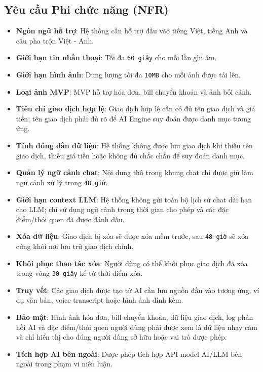 \subsection{Yêu cầu Phi chức năng (NFR)}

\begin{itemize}
\item \textbf{Ngôn ngữ hỗ trợ}: Hệ thống cần hỗ trợ đầu vào tiếng Việt, tiếng Anh và câu pha trộn Việt - Anh.
\item \textbf{Giới hạn tin nhắn thoại}: Tối đa \texttt{60 giây} cho mỗi lần ghi âm.
\item \textbf{Giới hạn hình ảnh}: Dung lượng tối đa \texttt{10MB} cho mỗi ảnh được tải lên.
\item \textbf{Loại ảnh MVP}: MVP hỗ trợ hóa đơn, bill chuyển khoản và ảnh bối cảnh.
\item \textbf{Tiêu chí giao dịch hợp lệ}: Giao dịch hợp lệ cần có đủ tên giao dịch và giá tiền; tên giao dịch phải đủ rõ để AI Engine suy đoán được danh mục tương ứng.
\item \textbf{Tính đúng đắn dữ liệu}: Hệ thống không được lưu giao dịch khi thiếu tên giao dịch, thiếu giá tiền hoặc không đủ chắc chắn để suy đoán danh mục.
\item \textbf{Quản lý ngữ cảnh chat}: Nội dung thô trong khung chat chỉ được giữ làm ngữ cảnh xử lý trong \texttt{48 giờ}.
\item \textbf{Giới hạn context LLM}: Hệ thống không gửi toàn bộ lịch sử chat dài hạn cho LLM; chỉ sử dụng ngữ cảnh trong thời gian cho phép và các đặc điểm/thói quen đã được đánh dấu.
\item \textbf{Xóa dữ liệu}: Giao dịch bị xóa sẽ được xóa mềm trước, sau \texttt{48 giờ} sẽ xóa cứng khỏi nơi lưu trữ giao dịch chính.
\item \textbf{Khôi phục thao tác xóa}: Người dùng có thể khôi phục giao dịch đã xóa trong vòng \texttt{30 giây} kể từ thời điểm xóa.
\item \textbf{Truy vết}: Các giao dịch được tạo từ AI cần lưu nguồn đầu vào tương ứng, ví dụ văn bản, voice transcript hoặc hình ảnh đính kèm.
\item \textbf{Bảo mật}: Hình ảnh hóa đơn, bill chuyển khoản, dữ liệu giao dịch, log phản hồi AI và đặc điểm/thói quen người dùng phải được xem là dữ liệu nhạy cảm và chỉ hiển thị cho đúng người dùng sở hữu hoặc vai trò được phép.
\item \textbf{Tích hợp AI bên ngoài}: Được phép tích hợp API model AI/LLM bên ngoài trong phạm vi niên luận.
\end{itemize}
